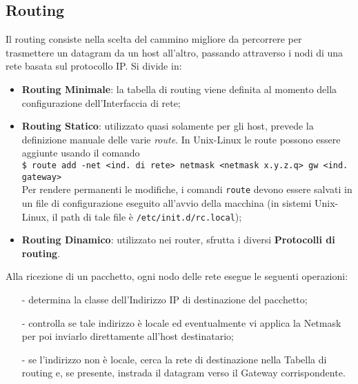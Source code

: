 \documentclass[a4paper,11pt]{article}
\def\code#1{\texttt{#1}}
\def\italic#1{\textit{#1}}
\begin{document}
\subsection{Routing}
Il routing consiste nella scelta del cammino migliore da percorrere per trasmettere un datagram da un host all'altro, passando attraverso i nodi di una rete basata sul protocollo IP. Si divide in:
\begin{itemize}
\item \textbf{Routing Minimale}: la tabella di routing viene definita al momento della configurazione dell'Interfaccia di rete;
\item \textbf{Routing Statico}: utilizzato quasi solamente per gli host, prevede la definizione manuale delle varie \italic{route}. In Unix-Linux le route possono essere aggiunte usando il comando \\
\code{\$ route add -net <ind. di rete> netmask <netmask x.y.z.q> gw <ind. gateway> }\\
Per rendere permanenti le modifiche, i comandi \code{route} devono essere salvati in un file di configurazione eseguito all'avvio della macchina (in sistemi Unix-Linux, il path di tale file è \code{/etc/init.d/rc.local}); 
\item \textbf{Routing Dinamico}: utilizzato nei router, sfrutta i diversi \textbf{Protocolli di routing}.
\end{itemize}
Alla ricezione di un pacchetto, ogni nodo delle rete esegue le seguenti operazioni:
\begin{itemize}
\item[-] determina la classe dell’Indirizzo IP di destinazione del pacchetto;
\item[-] controlla se tale indirizzo è locale ed eventualmente vi applica la Netmask per poi inviarlo direttamente all'host destinatario;
\item[-] se l'indirizzo non è locale, cerca la rete di destinazione nella Tabella di routing e, se presente, instrada il datagram verso il Gateway corrispondente.
\end{itemize}
\end{document}
